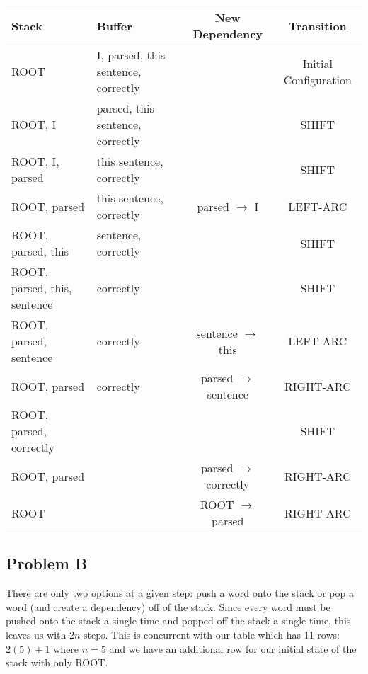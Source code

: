 \documentclass[12pt]{article}
\begin{document}
\bigskip
\scriptsize
\addtolength{\tabcolsep}{-1pt}
\begin{tabular}{l|l|c|c}
    Stack & Buffer & New Dependency & Transition \\
    \hline
    ROOT & I, parsed, this sentence, correctly && Initial Configuration \\
    ROOT, I & parsed, this sentence, correctly && SHIFT \\
    ROOT, I, parsed & this sentence, correctly && SHIFT \\
    ROOT, parsed & this sentence, correctly & parsed $\rightarrow$ I & LEFT-ARC \\
    ROOT, parsed, this & sentence, correctly  && SHIFT \\
    ROOT, parsed, this, sentence & correctly && SHIFT \\
    ROOT, parsed, sentence & correctly & sentence $\rightarrow$ this & LEFT-ARC \\
    ROOT, parsed & correctly & parsed $\rightarrow$ sentence & RIGHT-ARC \\
    ROOT, parsed, correctly &&& SHIFT \\
    ROOT, parsed && parsed $\rightarrow$ correctly & RIGHT-ARC \\
    ROOT && ROOT $\rightarrow$ parsed & RIGHT-ARC \\
\end{tabular}

\normalsize
\subsection{Problem B}
There are only two options at a given step: push a word onto the stack or pop 
a word (and create a dependency) off of the stack. Since every word must be 
pushed onto the stack a single time and popped off the stack a single time, 
this leaves us with $2n$ steps. This is concurrent with our table which has 
11 rows: $2(5) + 1$ where $n = 5$ and we have an additional row for our 
initial state of the stack with only ROOT. 
\end{document}
